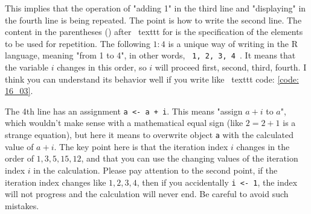 \documentclass{ltjsbook}
\begin{document}
This implies that the operation of "adding 1" in the third line and "displaying" in the fourth line is being repeated.
The point is how to write the second line. The content in the parentheses () after \ texttt {for} is the specification of the elements to be used for repetition. The following $1:4$ is a unique way of writing in the R language, meaning "from 1 to 4", in other words, \verb| 1, 2, 3, 4 |. It means that the variable $ i $ changes in this order, so $ i $ will proceed first, second, third, fourth. I think you can understand its behavior well if you write like \ texttt {code: \ref{code: 16_03}}.



The 4th line has an assignment \verb|a <- a + i|. This means "assign $a+i$ to $a$", which wouldn't make sense with a mathematical equal sign (like $2 = 2 + 1$ is a strange equation), but here it means to overwrite object \verb|a| with the calculated value of $a + i$. The key point here is that the iteration index $i$ changes in the order of $1,3,5,15,12$, and that you can use the changing values of the iteration index $i$ in the calculation. Please pay attention to the second point, if the iteration index changes like $1,2,3,4$, then if you accidentally \verb|i <- 1|, the index will not progress and the calculation will never end. Be careful to avoid such mistakes.
\end{document}
